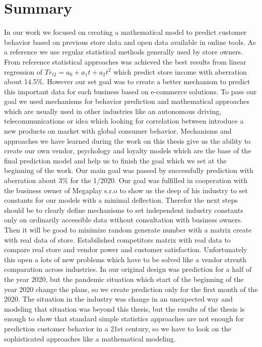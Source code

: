 
\chapter{Summary} \label{summary}
In our work we focused on creating a mathematical model to predict customer behavior based on previous store data and open data available in online tools.
As a reference we use regular statistical methods generally used by store owners.
From reference statistical approaches was achieved the best results from linear regression of $Tr_{t2}=a_0+a_1t+a_2t^2$ which predict store income with aberration about 14.5\%.
However our set goal was to create a better mechanism to predict this important data for each business based on e-commerce solutions.
To pass our goal we used mechanisms for behavior prediction and mathematical approaches which are usually used in other industries like an autonomous driving,
telecommunications or idea which looking for correlation between introduce a new products on market with global consumer behavior.
Mechanisms and approaches we have learned during the work on this thesis give us the ability to create our own vendor, psychology and loyalty models which are the
base of the final prediction model and help us to finish the goal which we set at the beginning of the work.
Our main goal was passed by successfully prediction with aberration about 3\% for the 1/2020.
Our goal was fulfilled in cooperation with the business owner of Megaplay s.r.o to show us the deep of his industry to set constants for our models with a minimal deflection.
Therefor the next steps should be to clearly define mechanisms to set independent industry constants only on ordinarily accessible data without consultation with business owners.
Then it will be good to minimize random generate number with a matrix create with real data of store. Estabilished competitors matrix with real data to compare real store and vendor power and customer satisfaction. Unfortunately this open a lots of new problems which have to be solved like a vendor strenth comparation across industries.
In our original design was prediction for a half of the year 2020, but the pandemic situation which start of the beginning of the year 2020 change the plans,
so we create prediction only for the first month of the 2020.
The situation in the industry was change in an unexpected way and modeling that situation was beyond this thesis, but the results of the thesis is enough to show that standard
simple statistics approaches are not enough for prediction customer behavior in a 21st century, so we have to look on the sophisticated approaches like a mathematical modeling.
